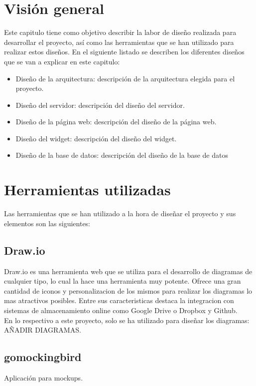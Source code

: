 \section{Visión general}
Este capitulo tiene como objetivo describir la labor de diseño realizada para desarrollar el proyecto, así como las herramientas que se han utilizado para realizar estos diseños. En el siguiente listado se describen los diferentes diseños que se van a explicar en este capitulo:

\begin{itemize}
	\item Diseño de la arquitectura: descripción de la arquitectura elegida para el proyecto.
	\item Diseño del servidor: descripción del diseño del servidor.
	\item Diseño de la página web: descripción del diseño de la página web.
	\item Diseño del widget: descripción del diseño del widget.
	\item Diseño de la base de datos: descripción del diseño de la base de datos
\end{itemize}

\section{Herramientas utilizadas}
Las herramientas que se han utilizado a la hora de diseñar el proyecto y sus elementos son las siguientes:

\subsection{Draw.io}
Draw.io es una herramienta web que se utiliza para el desarrollo de diagramas de cualquier tipo, lo cual la hace una herramienta muy potente. Ofrece una gran cantidad de iconos y personalizacion de los mismos para realizar los diagramas lo mas atractivos posibles. Entre sus caracteristicas destaca la integracion con sistemas de almacenamiento online como Google Drive o Dropbox y Github.\\

En lo respectivo a este proyecto, solo se ha utilizado para diseñar los diagramas: AÑADIR DIAGRAMAS.

\subsection{gomockingbird}

Aplicación para mockups.

